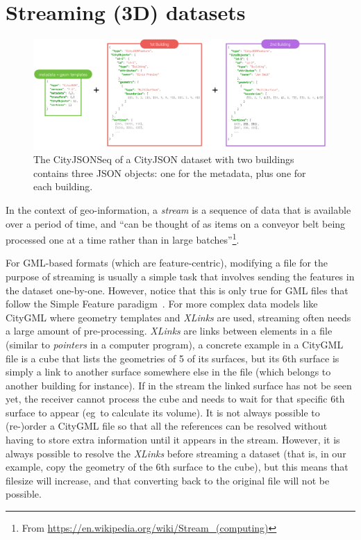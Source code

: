 \documentclass{isprs} %
\newcommand{\eg}{eg}
\begin{document}
\section{Streaming (3D) datasets}%
\label{sec:streaming}
\begin{figure}[th]
  \centering
  \includegraphics[width=0.95\linewidth]{figs/cjseq_idea}
  \caption{The CityJSONSeq of a CityJSON dataset with two buildings contains three JSON objects: one for the metadata, plus one for each building.}%
\label{fig:cjseq_idea}
\end{figure}
In the context of geo-information, a \emph{stream} is a sequence of data that is available over a period of time, and ``can be thought of as items on a conveyor belt being processed one at a time rather than in large batches''\footnote{From \url{https://en.wikipedia.org/wiki/Stream_(computing)}}.

%

For GML-based formats (which are feature-centric), modifying a file for the purpose of streaming is usually a simple task that involves sending the features in the dataset one-by-one.
However, notice that this is only true for GML files that follow the Simple Feature paradigm~\citep{OGC-SF}.
For more complex data models like CityGML where geometry templates and \emph{XLinks} are used, streaming often needs a large amount of pre-processing.
\emph{XLinks} are links between elements in a file (similar to \emph{pointers} in a computer program), a concrete example in a CityGML file is a cube that lists the geometries of 5 of its surfaces, but its 6th surface is simply a link to another surface somewhere else in the file (which belongs to another building for instance).
If in the stream the linked surface has not be seen yet, the receiver cannot process the cube and needs to wait for that specific 6th surface to appear (\eg\ to calculate its volume).
It is not always possible to (re-)order a CityGML file so that all the references can be resolved without having to store extra information until it appears in the stream.
However, it is always possible to resolve the \emph{XLinks} before streaming a dataset (that is, in our example, copy the geometry of the 6th surface to the cube), but this means that filesize will increase, and that converting back to the original file will not be possible.
\end{document}
